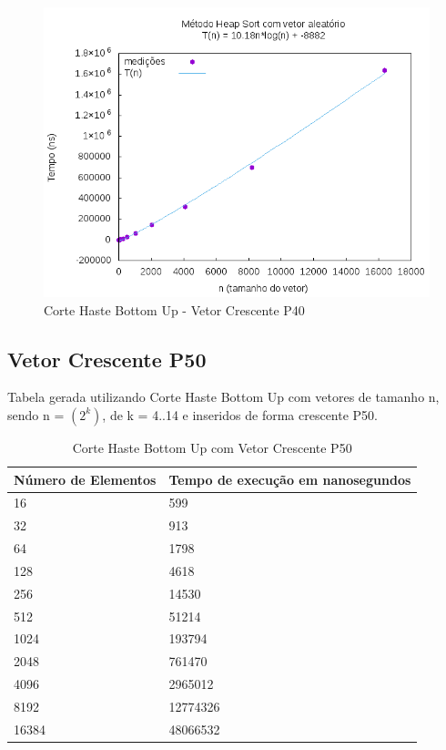 \documentclass[12pt,a4paper,twoside]{report}
\begin{document}
\begin{figure}[H]
    \centering
    \includegraphics[width=0.7\linewidth]{graficos/HeapSort/vIntAleatorio/vIntAleatorio.png}
  \caption{Corte Haste Bottom Up - Vetor Crescente P40}
\end{figure}




\subsection{Vetor Crescente P50}
Tabela gerada utilizando Corte Haste Bottom Up com vetores de tamanho n, sendo n = $(2^k)$, de k = 4..14 e inseridos de forma crescente P50.
\begin{table}[H]
\centering
\caption{Corte Haste Bottom Up com Vetor Crescente P50}
\label{my-label}
\begin{tabular}{|l|l|}
\hline
\multicolumn{1}{|c|}{\textbf{Número de Elementos}} & \multicolumn{1}{c|}{\textbf{Tempo de execução em nanosegundos}} \\ \hline
16 & 599 \\ \hline
32 & 913 \\ \hline
64 & 1798 \\ \hline
128 & 4618 \\ \hline
256 & 14530 \\ \hline
512 & 51214 \\ \hline
1024 & 193794 \\ \hline
2048 & 761470 \\ \hline
4096 & 2965012 \\ \hline
8192 & 12774326 \\ \hline
16384 & 48066532 \\ \hline
\end{tabular}
\end{table}
\end{document}
